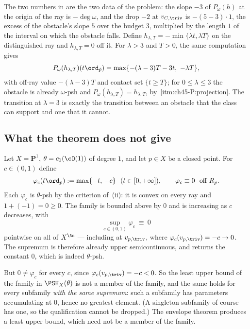 \begin{remark}
\label{rem:ch45-cuspidal-degree}
The two numbers in  are the two data of the
problem: the slope $-3$ of $P_\omega(h)$ at the origin of the ray is
$-\deg\omega$, and the drop $-2$ at $v_{C,\triv}$ is
$-(5-3)\cdot1$, the excess of the obstacle's slope $5$ over the budget
$3$, multiplied by the length $1$ of the interval on which the obstacle
falls.  Define $h_{\lambda,T}=-\min\{\lambda t,\lambda T\}$ on the
distinguished ray and $h_{\lambda,T}=0$ off it.  For $\lambda>3$ and
$T>0$, the same computation gives
\[
 P_\omega(h_{\lambda,T})(t\ord_{\tilde p})
 =\max\{-(\lambda-3)T-3t,\ -\lambda T\},
\]
with off-ray value $-(\lambda-3)T$ and contact set $\{t\ge T\}$;
for $0\le\lambda\le3$ the obstacle is
already $\omega$-psh and $P_\omega(h_{\lambda,T})=h_{\lambda,T}$, by
\,\cref{itm:ch45-P:projection}.  The
transition at $\lambda=3$ is exactly the transition between an obstacle
that the class can support and one that it cannot.
\end{remark}

\subsection{What the theorem does not give}
\label{sec:ch45-not-given}

\begin{example}[No attainment]
\label{ex:ch45-no-attainment}
Let $X=\mathbf P^1$, $\theta=c_1(\cO(1))$ of degree $1$, and let
$p\in X$ be a closed point.  For $c\in(0,1)$ define
\[
 \varphi_c(t\ord_p):=\max\{-t,\,-c\}\ \ (t\in[0,+\infty]),
 \qquad
 \varphi_c\equiv0\ \text{ off }R_p .
\]
Each $\varphi_c$ is $\theta$-psh by the criterion of
\,(ii): it is convex on every ray and
$1+(-1)=0\ge0$.  The family is bounded above by $0$ and is increasing as
$c$ decreases, with
\[
 \sup_{c\in(0,1)}\varphi_c\ \equiv\ 0
\]
pointwise on all of $X^{\An}$ --- including at $v_{p,\triv}$, where
$\varphi_c(v_{p,\triv})=-c\to0$.  The supremum is therefore already upper
semicontinuous, and  returns the constant $0$,
which is indeed $\theta$-psh.

But $0\ne\varphi_c$ for every $c$, since $\varphi_c(v_{p,\triv})=-c<0$.
So the least upper bound of the family in $\PSH_X(\theta)$ is not a member
of the family, and the same holds for every subfamily \emph{with the same
supremum}: such a subfamily has parameters accumulating at $0$, hence no
greatest element.  (A singleton subfamily of course has one, so the
qualification cannot be dropped.)  The envelope theorem
produces a least upper bound, which need not be a member of the family.
\end{example}

